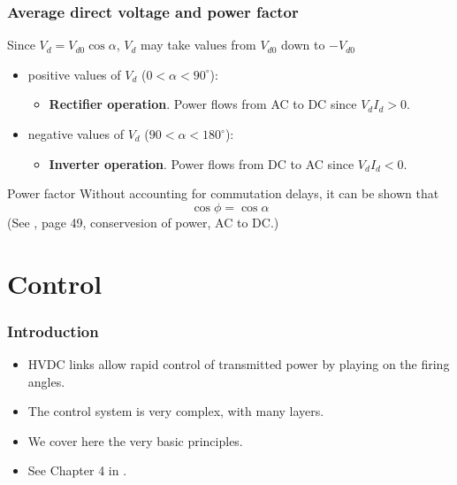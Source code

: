 \begin{frame}
\frametitle{Average direct voltage and power factor}
Since $V_{d} = V_{d0} \cos \alpha$, $V_d$ may take values from $V_{d0}$ down to $-V_{d0}$
\begin{itemize}
    \item positive values of $V_d$ ($0 < \alpha < 90^{\circ}$):
    \begin{itemize}
        \item \textbf{Rectifier operation}. Power flows from AC to DC since $V_d I_d > 0$.
    \end{itemize}
    \item negative values of $V_d$ ($90 < \alpha < 180^{\circ}$):
    \begin{itemize}
        \item \textbf{Inverter operation}. Power flows from DC to AC since $V_d I_d < 0$.
    \end{itemize}
    
\end{itemize}
\begin{block}{Power factor}
Without accounting for commutation delays, it can be shown that
$$\cos \phi = \cos \alpha$$    (See \cite{padiyar1990hvdc}, page 49, conservesion of power, AC to DC.)
\end{block}
\end{frame}



\section{Control}


\begin{frame}
    \frametitle{Introduction}

    \begin{itemize}
        \item HVDC links allow rapid control of transmitted power by playing on the firing angles.
        \item The control system is very complex, with many layers.  
        \item We cover here the very basic principles.
        \item See Chapter 4 in \cite{padiyar1990hvdc}.
    \end{itemize}
\end{frame}

